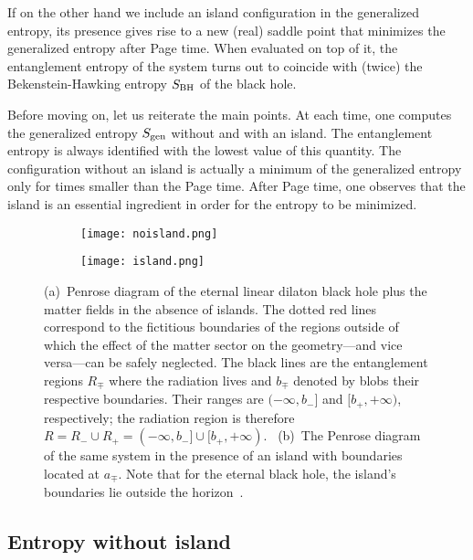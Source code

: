 \documentclass[a4paper, 12pt]{article}
\begin{document}
If on the other hand we include an island configuration in the generalized entropy, its presence gives rise to a new (real) saddle point that minimizes the generalized entropy after Page time. When evaluated on top of it, the entanglement entropy of the system turns out to coincide with (twice) the Bekenstein-Hawking entropy $S_{\rm BH}$ of the black hole. 

Before moving on, let us reiterate the main points. At each time, one computes the generalized entropy $S_{\rm gen}$ without and with an island. The entanglement entropy is always  identified with the lowest value of this quantity. The configuration without an island is actually a minimum of the generalized entropy only for times smaller than the Page time. After Page time, one observes that the island is an essential ingredient in order for the entropy to be minimized. 

\begin{figure}[!h]
\begin{subfigure}{.5\textwidth}
\centering
\texttt{[image: noisland.png]}
\caption{}
\label{fig:no_island}
\end{subfigure}
\begin{subfigure}{.5\textwidth}
\centering
\texttt{[image: island.png]}
\caption{}
\label{fig:island}
\end{subfigure}
\caption{(a)~Penrose diagram of the eternal linear dilaton black hole plus the matter fields in the absence of islands. The dotted red lines correspond to the fictitious boundaries of the regions outside of which the effect of the matter sector on the geometry---and vice versa---can be safely neglected.   The black lines are the entanglement regions $R_\mp$ where the radiation lives and $b_\mp$ denoted by blobs their respective  boundaries. Their ranges are $(-\infty,b_-]$ and $[b_+,+\infty)$, respectively; the radiation region is therefore $R=R_-\cup R_+=(-\infty,b_-]\cup [b_+,+\infty)$. ~(b)~The Penrose diagram of the same  system in the presence of an island with boundaries located at $a_\mp$. Note that for the eternal black hole, the island's boundaries lie outside the horizon~\cite{Almheiri:2019yqk,Gautason:2020tmk,Anegawa:2020ezn}.}
\label{fig:Penrose_2}
\end{figure}

\subsection{Entropy without island}
\end{document}
